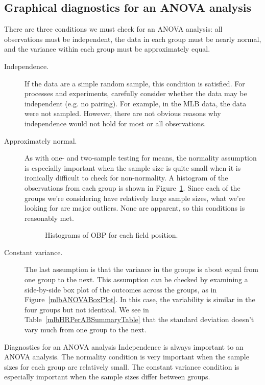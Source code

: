 \subsection{Graphical diagnostics for an ANOVA analysis}

There are three conditions we must check for an ANOVA analysis:
all observations must be independent,
the data in each group must be nearly normal,
and the variance within each group must be approximately equal.
\begin{description}
\item[Independence.]
    If the data are a simple random sample,
    this condition is satisfied.
    For processes and experiments, carefully consider whether
    the data may be independent (e.g. no pairing).
    For example, in the MLB data, the data were not sampled.
    However, there are not obvious reasons why independence
    would not hold for most or all observations.
\item[Approximately normal.]
    As with one- and two-sample testing for means,
    the normality assumption is especially important
    when the sample size is quite small when it is
    ironically difficult to check for non-normality.
    A histogram of the observations from each group
    is shown in Figure~\ref{mlbANOVADiagNormalityGroups}.
    Since each of the groups we're considering have
    relatively large sample sizes,
    what we're looking for are major outliers.
    None are apparent, so this conditions is reasonably met.
    \begin{figure}[h]
      \centering
      \caption{Histograms of OBP for each field position.}
      \label{mlbANOVADiagNormalityGroups}
    \end{figure}
\item[Constant variance.]
    The last assumption is that the variance in the
    groups is about equal from one group to the next.
    This assumption can be checked by examining a
    side-by-side box plot of the outcomes across the
    groups, as in Figure~\vref{mlbANOVABoxPlot}.
    In this case, the variability is similar in the
    four groups but not identical.
    We see in Table~\vref{mlbHRPerABSummaryTable}
    that the standard deviation doesn't vary much
    from one group to the next.
\end{description}


\begin{onebox}{Diagnostics for an ANOVA analysis}
  Independence is always important to an ANOVA analysis.
  The normality condition is very important when the sample
  sizes for each group are relatively small.
  The constant variance condition is especially important
  when the sample sizes differ between groups.
\end{onebox}


